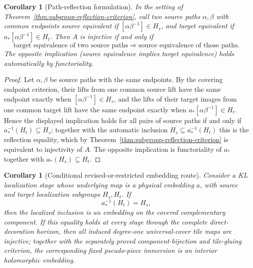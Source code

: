 \documentclass[11pt,reqno]{amsart}
\newtheorem{corollary}[theorem]{Corollary}
\theoremstyle{definition}
\theoremstyle{remark}
\begin{document}
\begin{corollary}[Path-reflection formulation]
\label{cor:path-reflection}
In the setting of Theorem~\ref{thm:subgroup-reflection-criterion}, call
two source paths \(\alpha,\beta\) with common endpoints \emph{source
equivalent} if \([\alpha\beta^{-1}]\in H_s\), and \emph{target
equivalent} if \(a_*[\alpha\beta^{-1}]\in H_t\).  Then \(A\) is
injective if and only if
\[
 \text{target equivalence of two source paths}
 \Longrightarrow
 \text{source equivalence of those paths}.
\]
The opposite implication (source equivalence implies target
equivalence) holds automatically by functoriality.
\end{corollary}

\begin{proof}
Let \(\alpha,\beta\) be source paths with the same endpoints.  By the
covering endpoint criterion, their lifts from one common source lift
have the same endpoint exactly when \([\alpha\beta^{-1}]\in H_s\), and
the lifts of their target images from one common target lift have the
same endpoint exactly when \(a_*[\alpha\beta^{-1}]\in H_t\).  Hence the
displayed implication holds for all pairs of source paths if and only
if \(a_*^{-1}(H_t)\subseteq H_s\); together with the automatic
inclusion \(H_s\subseteq a_*^{-1}(H_t)\) this is the reflection
equality, which by Theorem~\ref{thm:subgroup-reflection-criterion} is
equivalent to injectivity of \(A\).  The opposite implication is
functoriality of \(a_*\) together with \(a_*(H_s)\subseteq H_t\).
\end{proof}
\begin{corollary}[Conditional revised-or-restricted embedding route]
\label{cor:conditional-embedding-route}
Consider a KL localization stage whose underlying map is a physical
embedding \(a\), with source and target localization subgroups
\(H_s,H_t\).  If
\[
 a_*^{-1}(H_t)=H_s,
\]
then the localized inclusion is an embedding on the covered
complementary component.  If this equality holds at every stage through
the complete direct-decoration horizon, then all induced degree-one
universal-cover tile maps are injective; together with the separately
proved component-bijection and tile-gluing criterion, the corresponding
fixed pseudo-piece immersion is an interior holomorphic embedding.
\end{corollary}
\end{document}
